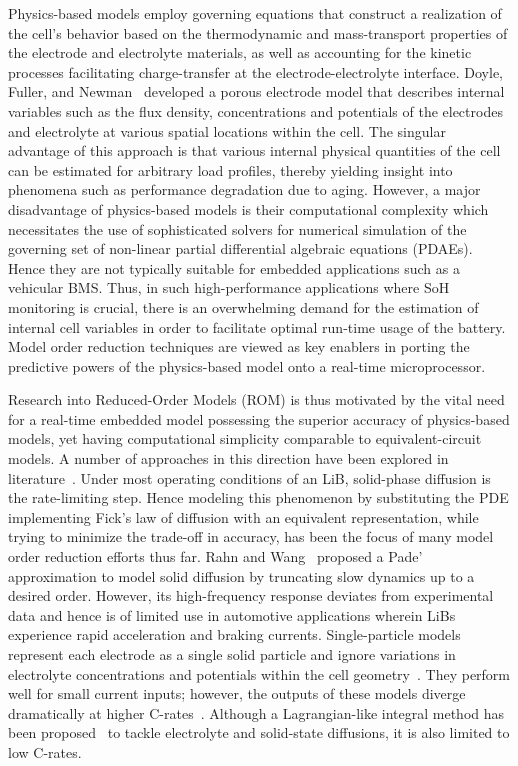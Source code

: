 Physics-based models employ governing equations that construct a realization
of the cell's behavior based on the thermodynamic and mass-transport
properties of the electrode and electrolyte materials, as well as
accounting for the kinetic processes facilitating charge-transfer
at the electrode-electrolyte interface. Doyle, Fuller, and Newman~\citep{DoyleFullerNewman1993,FullerDoyleNewman1994}
developed a porous electrode model that describes internal variables
such as the flux density, concentrations and potentials of the electrodes
and electrolyte at various spatial locations within the cell. The
singular advantage of this approach is that various internal physical
quantities of the cell can be estimated for arbitrary load profiles,
thereby yielding insight into phenomena such as performance degradation
due to aging. However, a major disadvantage of physics-based models
is their computational complexity which necessitates the use of sophisticated
solvers for numerical simulation of the governing set of non-linear
partial differential algebraic equations (PDAEs). Hence they are not
typically suitable for embedded applications such as a vehicular BMS.
Thus, in such high-performance applications where SoH monitoring is
crucial, there is an overwhelming demand for the estimation of internal
cell variables in order to facilitate optimal run-time usage of the
battery. Model order reduction techniques are viewed as key enablers
in porting the predictive powers of the physics-based model onto a
real-time microprocessor.

Research into Reduced-Order Models (ROM) is thus motivated by the
vital need for a real-time embedded model possessing the superior
accuracy of physics-based models, yet having computational simplicity
comparable to equivalent-circuit models. A number of approaches in
this direction have been explored in literature~\citep{BizerayZhaoDuncanEtAl2015,DaoVyasarayaniMcPhee2012,SubramanianBoovaragavanDiwakar2007,CaiWhite2009}.
Under most operating conditions of an LiB, solid-phase diffusion is
the rate-limiting step. Hence modeling this phenomenon by substituting
the PDE implementing Fick's law of diffusion with an equivalent representation,
while trying to minimize the trade-off in accuracy, has been the focus
of many model order reduction efforts thus far. Rahn and Wang~\citep{RahnWang2013}
proposed a Pade\textquoteright{} approximation to model solid diffusion
by truncating slow dynamics up to a desired order. However, its high-frequency
response deviates from experimental data and hence is of limited use
in automotive applications wherein LiBs experience rapid acceleration
and braking currents. Single-particle models represent each electrode
as a single solid particle and ignore variations in electrolyte concentrations
and potentials within the cell geometry~\citep{NingPopov2004}. They
perform well for small current inputs; however, the outputs of these
models diverge dramatically at higher C-rates~\citep{Romero-BecerrilAlvarez-Icaza2011,SanthanagopalanGuoRamadassEtAl2006}.
Although a Lagrangian-like integral method has been proposed~\citep{RahnWang2013}
to tackle electrolyte and solid-state diffusions, it is also limited
to low C-rates.

